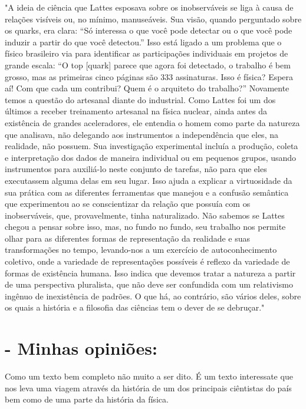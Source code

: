 \documentclass [a4paper, 12pt]{article}
\begin{document}
"A ideia de ciência que Lattes esposava sobre os inobserváveis se liga à causa de relações visíveis ou, no mínimo, manuseáveis. Sua visão, quando perguntado sobre os quarks, era clara: “Só interessa o que você pode detectar ou o que você pode induzir a partir do que você detectou.” Isso está ligado a um problema que o físico brasileiro via para identificar as participações individuais em projetos de grande escala: “O top [quark] parece que agora foi detectado, o trabalho é bem grosso, mas as primeiras cinco páginas são 333 assinaturas. Isso é física? Espera aí! Com que cada um contribui? Quem é o arquiteto do trabalho?” Novamente temos a questão do artesanal diante do industrial. Como Lattes foi um dos últimos a receber treinamento artesanal na física nuclear, ainda antes da existência de grandes aceleradores, ele entendia o homem como parte da natureza que analisava, não delegando aos instrumentos a independência que eles, na realidade, não possuem. Sua investigação experimental incluía a produção, coleta e interpretação dos dados de maneira individual ou em pequenos grupos, usando instrumentos para auxiliá-lo neste conjunto de tarefas, não para que eles executassem alguma delas em seu lugar. Isso ajuda a explicar a virtuosidade da sua prática com as diferentes ferramentas que manejou e a confusão semântica que experimentou ao se conscientizar da relação que possuía com os inobserváveis, que, provavelmente, tinha naturalizado.
Não sabemos se Lattes chegou a pensar sobre isso, mas, no fundo no fundo, seu trabalho nos permite olhar para as diferentes formas de representação da realidade e suas transformações no tempo, levando-nos a um exercício de autoconhecimento coletivo, onde a variedade de representações possíveis é reflexo da variedade de formas de existência humana. Isso indica que devemos tratar a natureza a partir de uma perspectiva pluralista, que não deve ser confundida com um relativismo ingênuo de inexistência de padrões. O que há, ao contrário, são vários deles, sobre os quais a história e a filosofia das ciências tem o dever de se debruçar."


\section*{- Minhas opiniões:}

Como um texto bem completo não muito a ser dito. É um texto interessate que nos leva uma viagem através da história de um dos principais ciêntistas do país bem como de uma parte da história da física.
\end{document}
